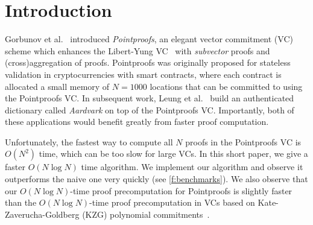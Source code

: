\section{Introduction}

Gorbunov et al.~\cite{GRWZ20} introduced \textit{Pointproofs}, an elegant vector commitment (VC) scheme which enhances the Libert-Yung VC~\cite{LY10} with \textit{subvector} proofs and (cross)aggregation of proofs.
Pointproofs was originally proposed for stateless validation in cryptocurrencies with smart contracts, where each contract is allocated a small memory of $N=1000$ locations that can be committed to using the Pointproofs VC.
In subsequent work, Leung et al.~\cite{LGG+20} build an authenticated dictionary called \textit{Aardvark} on top of the Pointproofs VC.
Importantly, both of these applications would benefit greatly from faster proof computation.

Unfortunately, the fastest way to compute all $N$ proofs in the Pointproofs VC is $O(N^2)$ time, which can be too slow for large VCs.
In this short paper, we give a faster $O(N\log{N})$ time algorithm.
We implement our algorithm and observe it outperforms the naive one very quickly (see \cref{f:benchmarks}).
We also observe that our $O(N\log{N})$-time proof precomputation for Pointproofs is slightly faster than the $O(N\log{N})$-time proof precomputation in VCs based on Kate-Zaverucha-Goldberg (KZG) polynomial commitments~\cite{KZG10,FK20,TAB+20}.

